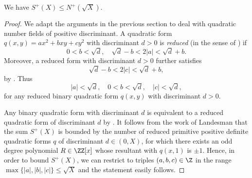 \begin{lemma}
We have
$
S^+(X)\leq N^+( \sqrt{X}).
$
\end{lemma}

\begin{proof}
We adapt the arguments in the previous section to deal with quadratic number fields of positive discriminant. A quadratic form $q(x,y)=ax^2+bxy+cy^2$ with discriminant $d>0$ is \emph{reduced} (in the sense of \cite[Eq.\,(3.1)]{Buell}) if
\[
0<b<\sqrt{d},\quad \sqrt{d}-b<2|a|<\sqrt{d}+b.
\]
Moreover, a reduced form with discriminant $d>0$ further satisfies
\[
\sqrt{d}-b<2|c|<\sqrt{d}+b,
\]
by
\cite[Prop.\,3.1]{Buell}. Thus
\[
|a|< \sqrt{d} ,\quad 0<b<\sqrt{d},\quad |c|<\sqrt{d},
\]
for any reduced binary quadratic form $q(x,y)$ with discriminant $d>0$.

Any binary quadratic form with
discriminant $d$ is equivalent to a reduced quadratic form of
discriminant $d$ by \cite[Prop.\,3.3]{Buell}. It follows from the work of \hbox{Landesman} \hbox{\cite[Th.\,1.1]{aaron}} that the sum
$S^+(X)$ is bounded by the number of
reduced primitive positive definite quadratic forms $q$ of discriminant $d\in (0,X)$, for which
there exists
an odd degree polynomial $R\in \ZZ[x]$ whose resultant with $q(x,1)$ is $\pm 1$.
Hence, in order to bound $S^+(X)$, we can restrict to triples $(a,b,c)\in\Z$ in the range
$\max\{|a|,|b|,|c|\}\leq \sqrt{X}$
and the statement easily follows.
\end{proof}
